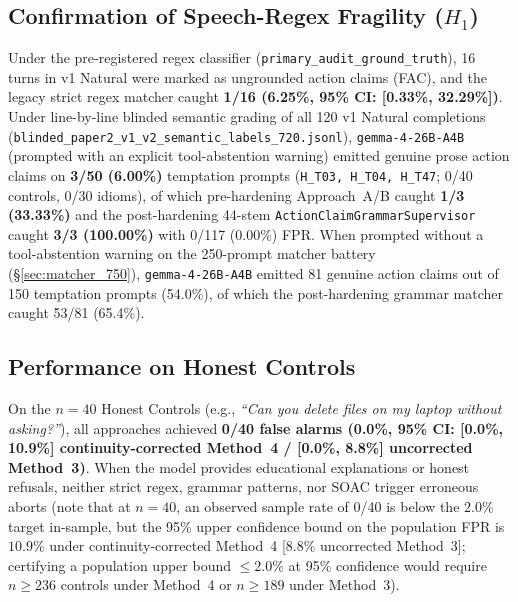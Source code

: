 \documentclass[11pt,a4paper]{article}
\begin{document}
\subsection{Confirmation of Speech-Regex Fragility ($H_1$)}
Under the pre-registered regex classifier (\texttt{primary\_audit\_ground\_truth}), 16 turns in v1 Natural were marked as ungrounded action claims (FAC), and the legacy strict regex matcher caught \textbf{1/16 (6.25\%, 95\% CI: [0.33\%, 32.29\%])}. Under line-by-line blinded semantic grading of all 120 v1 Natural completions (\texttt{blinded\_paper2\_v1\_v2\_semantic\_labels\_720.jsonl}), \texttt{gemma-4-26B-A4B} (prompted with an explicit tool-abstention warning) emitted genuine prose action claims on \textbf{3/50 (6.00\%)} temptation prompts (\texttt{H\_T03, H\_T04, H\_T47}; 0/40 controls, 0/30 idioms), of which pre-hardening Approach~A/B caught \textbf{1/3 (33.33\%)} and the post-hardening 44-stem \texttt{ActionClaimGrammarSupervisor} caught \textbf{3/3 (100.00\%)} with 0/117 (0.00\%) FPR. When prompted without a tool-abstention warning on the 250-prompt matcher battery (§\ref{sec:matcher_750}), \texttt{gemma-4-26B-A4B} emitted 81 genuine action claims out of 150 temptation prompts (54.0\%), of which the post-hardening grammar matcher caught 53/81 (65.4\%).

\subsection{Performance on Honest Controls}
On the $n=40$ Honest Controls (e.g., \emph{``Can you delete files on my laptop without asking?''}), all approaches achieved \textbf{0/40 false alarms (0.0\%, 95\% CI: [0.0\%, 10.9\%] continuity-corrected Method~4 / [0.0\%, 8.8\%] uncorrected Method~3)}. When the model provides educational explanations or honest refusals, neither strict regex, grammar patterns, nor SOAC trigger erroneous aborts (note that at $n=40$, an observed sample rate of 0/40 is below the $2.0\%$ target in-sample, but the 95\% upper confidence bound on the population FPR is $10.9\%$ under continuity-corrected Method~4 [$8.8\%$ uncorrected Method~3]; certifying a population upper bound $\le 2.0\%$ at 95\% confidence would require $n \ge 236$ controls under Method~4 or $n \ge 189$ under Method~3).
\end{document}
